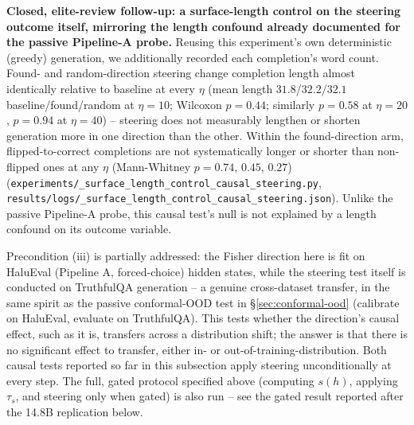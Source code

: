 \documentclass[onecolumn]{jmlr}
\begin{document}
\textbf{Closed, elite-review follow-up: a surface-length control on the
steering outcome itself, mirroring the length confound already
documented for the passive Pipeline-A probe.} Reusing this experiment's
own deterministic (greedy) generation, we additionally recorded each
completion's word count. Found- and random-direction steering change
completion length almost identically relative to baseline at every
$\eta$ (mean length $31.8$/$32.2$/$32.1$ baseline/found/random at
$\eta{=}10$; Wilcoxon $p=0.44$; similarly $p=0.58$ at $\eta{=}20$,
$p=0.94$ at $\eta{=}40$) -- steering does not measurably lengthen or
shorten generation more in one direction than the other. Within the
found-direction arm, flipped-to-correct completions are not
systematically longer or shorter than non-flipped ones at any $\eta$
(Mann-Whitney $p=0.74$, $0.45$, $0.27$)
(\texttt{experiments/\_\allowbreak surface\_\allowbreak length\_\allowbreak control\_\allowbreak causal\_\allowbreak steering.py},
\texttt{results/\allowbreak logs/\_\allowbreak surface\_\allowbreak length\_\allowbreak control\_\allowbreak causal\_\allowbreak steering.json}).
Unlike the passive Pipeline-A probe, this causal test's null is not
explained by a length confound on its outcome variable.

Precondition (iii) is partially addressed: the Fisher direction here
is fit on HaluEval (Pipeline A, forced-choice) hidden states, while the
steering test itself is conducted on TruthfulQA generation -- a
genuine cross-dataset transfer, in the same spirit as the passive
conformal-OOD test in \S\ref{sec:conformal-ood} (calibrate on
HaluEval, evaluate on TruthfulQA). This tests whether the direction's
causal effect, such as it is, transfers across a distribution shift;
the answer is that there is no significant effect to transfer, either
in- or out-of-training-distribution. Both causal tests reported so far
in this subsection apply steering unconditionally at every step. The
full, gated protocol specified above (computing $s(h)$, applying
$\tau_s$, and steering only when gated) is also run -- see
the gated result reported after the 14.8B replication below.
\end{document}

